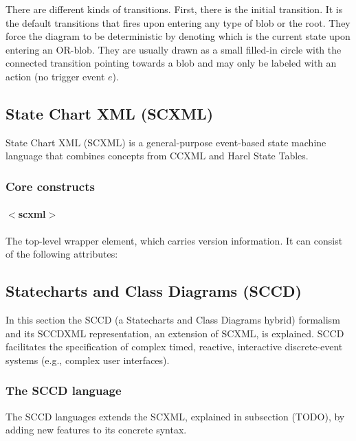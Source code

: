 There are different kinds of transitions. First, there is the initial transition. It is the default transitions that 
fires upon entering any type of blob or the root. They force the diagram to be deterministic by denoting which is the 
current state upon entering an OR-blob. They are usually drawn as a small filled-in circle with the connected transition 
pointing towards a blob and may only be labeled with an action (no trigger event $e$).







\subsection{State Chart XML (SCXML)}
State Chart XML (SCXML) is a general-purpose event-based state machine language that combines concepts from CCXML and Harel 
State Tables. 

\subsubsection{Core constructs}

\paragraph{$<$scxml$>$}
The top-level wrapper element, which carries version information. It can consist of the following attributes:


















\subsection{Statecharts and Class Diagrams (SCCD)}
In this section the SCCD (a Statecharts and Class Diagrams hybrid) formalism and its SCCDXML representation, an extension 
of SCXML, is explained. SCCD facilitates the specification of complex timed, reactive, interactive discrete-event systems 
(e.g., complex user interfaces).

\subsubsection{The SCCD language}
The SCCD languages extends the SCXML, explained in subsection (TODO), by adding new features to its concrete syntax.

